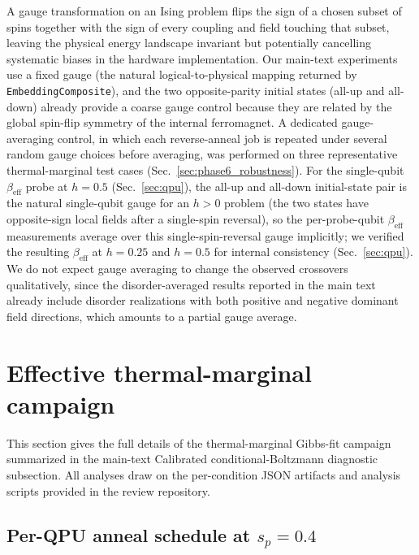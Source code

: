 \documentclass[aps,prapplied,reprint,superscriptaddress,floatfix,nofootinbib]{revtex4-2}
\begin{document}
A gauge transformation on an Ising problem flips the sign of a chosen subset of spins together with the sign of every coupling and field touching that subset, leaving the physical energy landscape invariant but potentially cancelling systematic biases in the hardware implementation.
Our main-text experiments use a fixed gauge (the natural logical-to-physical mapping returned by \texttt{EmbeddingComposite}), and the two opposite-parity initial states (all-up and all-down) already provide a coarse gauge control because they are related by the global spin-flip symmetry of the internal ferromagnet.
A dedicated gauge-averaging control, in which each reverse-anneal job is repeated under several random gauge choices before averaging, was performed on three representative thermal-marginal test cases (Sec.~\ref{sec:phase6_robustness}).
For the single-qubit $\beta_\mathrm{eff}$ probe at $h=0.5$ (Sec.~\ref{sec:qpu}), the all-up and all-down initial-state pair is the natural single-qubit gauge for an $h>0$ problem (the two states have opposite-sign local fields after a single-spin reversal), so the per-probe-qubit $\beta_\mathrm{eff}$ measurements average over this single-spin-reversal gauge implicitly; we verified the resulting $\beta_\mathrm{eff}$ at $h=0.25$ and $h=0.5$ for internal consistency (Sec.~\ref{sec:qpu}).
We do not expect gauge averaging to change the observed crossovers qualitatively, since the disorder-averaged results reported in the main text already include disorder realizations with both positive and negative dominant field directions, which amounts to a partial gauge average.

\section{Effective thermal-marginal campaign}
\label{sec:phase6}

This section gives the full details of the thermal-marginal Gibbs-fit campaign
summarized in the main-text Calibrated conditional-Boltzmann diagnostic subsection.
All analyses draw on the per-condition JSON artifacts and analysis scripts
provided in the review repository.

\subsection{Per-QPU anneal schedule at $s_p=0.4$}
\label{sec:phase6_schedule}
\end{document}

